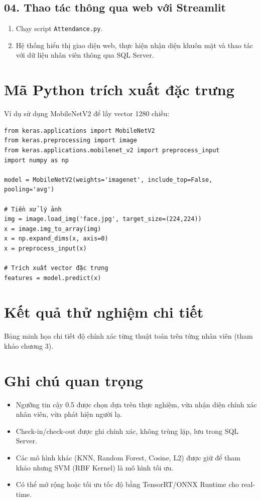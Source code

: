 \documentclass[a4paper]{book}
\begin{document}
\subsection*{04. Thao tác thông qua web với Streamlit}
\begin{enumerate}
    \item Chạy script \texttt{Attendance.py}.
    \item Hệ thống hiển thị giao diện web, thực hiện nhận diện khuôn mặt và thao tác với dữ liệu nhân viên thông qua SQL Server.
\end{enumerate}


\section{Mã Python trích xuất đặc trưng}
Ví dụ sử dụng MobileNetV2 để lấy vector 1280 chiều:
\begin{verbatim}
from keras.applications import MobileNetV2
from keras.preprocessing import image
from keras.applications.mobilenet_v2 import preprocess_input
import numpy as np

model = MobileNetV2(weights='imagenet', include_top=False, pooling='avg')

# Tiền xử lý ảnh
img = image.load_img('face.jpg', target_size=(224,224))
x = image.img_to_array(img)
x = np.expand_dims(x, axis=0)
x = preprocess_input(x)

# Trích xuất vector đặc trưng
features = model.predict(x)
\end{verbatim}

\section{Kết quả thử nghiệm chi tiết}
Bảng minh họa chi tiết độ chính xác từng thuật toán trên từng nhân viên (tham khảo chương 3).

\section{Ghi chú quan trọng}
\begin{itemize}
    \item Ngưỡng tin cậy 0.5 được chọn dựa trên thực nghiệm, vừa nhận diện chính xác nhân viên, vừa phát hiện người lạ.
    \item Check-in/check-out được ghi chính xác, không trùng lặp, lưu trong SQL Server.
    \item Các mô hình khác (KNN, Random Forest, Cosine, L2) được giữ để tham khảo nhưng SVM (RBF Kernel) là mô hình tối ưu.
    \item Có thể mở rộng hoặc tối ưu tốc độ bằng TensorRT/ONNX Runtime cho real-time.
\end{itemize}
\end{document}
